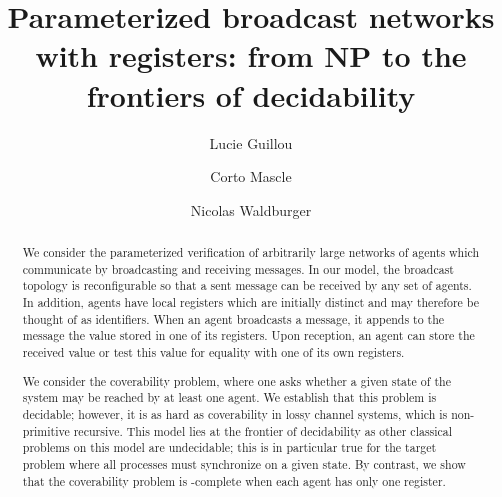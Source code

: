 \documentclass[a4paper,UKenglish,cleveref, autoref, thm-restate]{lipics-v2021}
\title{Parameterized broadcast networks with registers: from NP to the frontiers of decidability}
\author{Lucie Guillou}{IRIF, Université de Paris}{}{}{}
\author{Corto Mascle}{LaBRI, Université de Bordeaux}{}{}{}
\author{Nicolas Waldburger}{IRISA, Universit\'e de Rennes}{}{}{}
\begin{document}
	
	\maketitle
	
		
	

	\begin{abstract}
	We consider the parameterized verification of arbitrarily large networks of agents which communicate by broadcasting and receiving messages. In our model, the broadcast topology is reconfigurable so that a sent message can be received by any set of agents. In addition, agents have local registers which are initially distinct and may therefore be thought of as identifiers.
	When an agent broadcasts a message, it appends to the message the value stored in one of its registers. Upon reception, an agent can store the received value or test this value for equality with one of its own registers. 

	We consider the coverability problem, where one asks whether a given state of the system may be reached by at least one agent. We establish that this problem is decidable; however, it is as hard as coverability in lossy channel systems, which is non-primitive recursive. 
	This model lies at the frontier of decidability as other classical problems on this model are undecidable; this is in particular true for the target problem where all processes must synchronize on a given state. 
	By contrast, we show that the coverability problem is \NP-complete when each agent has only one register.
	
	\end{abstract}
\end{document}
